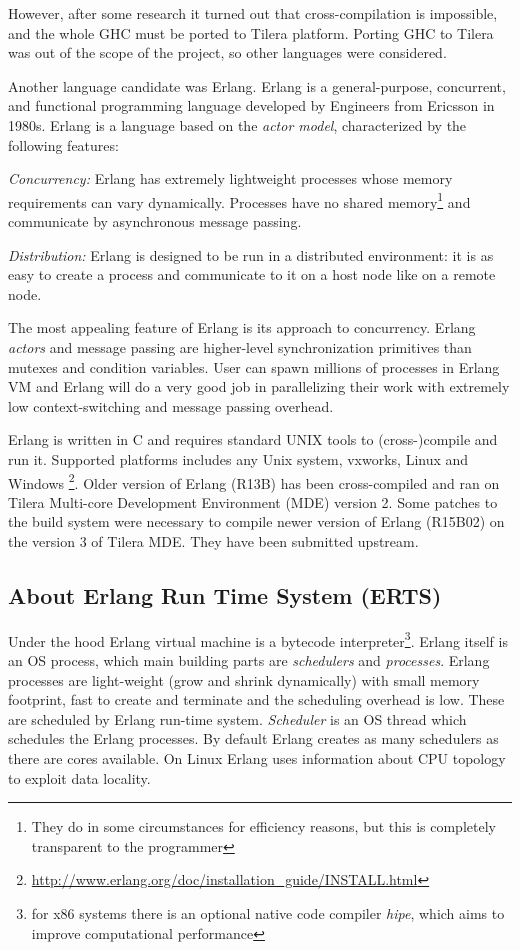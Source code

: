 \documentclass[english,11pt]{l4proj}
\begin{document}
However, after some research it turned out that cross-compilation is impossible,
and the whole GHC must be ported to Tilera platform. Porting GHC to Tilera was
out of the scope of the project, so other languages were considered.

Another language candidate was Erlang. Erlang is a general-purpose, concurrent,
and functional programming language developed by Engineers from Ericsson in
1980s. Erlang is a language based on the  {\em actor model}, characterized by
the following features:

{\em Concurrency:} Erlang has extremely lightweight processes whose memory
requirements can vary dynamically. Processes have no shared
memory\footnote{They do in some circumstances for efficiency reasons, but this
is completely transparent to the programmer} and communicate by asynchronous
message passing.

{\em Distribution:} Erlang is designed to be run in a distributed
environment: it is as easy to create a process and communicate to
it on a host node like on a remote node.

The most appealing feature of Erlang is its approach to concurrency. Erlang {\em
actors} and message passing are higher-level synchronization primitives than
mutexes and condition variables. User can spawn millions of processes in Erlang
VM and Erlang will do a very good job in parallelizing their work with extremely
low context-switching and message passing overhead.

Erlang is written in C and requires standard UNIX tools to (cross-)compile and
run it. Supported platforms includes any Unix system, vxworks, Linux and
Windows
\footnote{\url{http://www.erlang.org/doc/installation\_guide/INSTALL.html}}.
Older version of Erlang (R13B) has been cross-compiled and ran on Tilera
Multi-core Development Environment (MDE) version 2. Some patches to the build
system were necessary to compile newer version of Erlang (R15B02) on the
version 3 of Tilera MDE. They have been submitted upstream.

\subsection{About Erlang Run Time System (ERTS)}

Under the hood Erlang virtual machine is a bytecode interpreter\footnote{for x86
systems there is an optional native code compiler \emph{hipe}\cite{hipe}, which
aims to improve computational performance}. Erlang itself is an OS process,
which main building parts are {\em schedulers} and {\em processes}. Erlang
processes are light-weight (grow and shrink dynamically) with small memory
footprint, fast to create and terminate and the scheduling overhead is low.
These are scheduled by Erlang run-time system. {\em Scheduler} is an OS thread
which schedules the Erlang processes. By default Erlang creates as many
schedulers as there are cores available. On Linux Erlang uses information about
CPU topology to exploit data locality.
\end{document}
